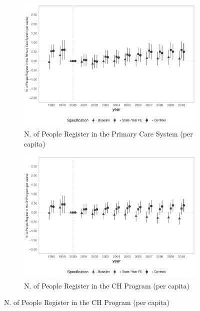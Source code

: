 \begin{figure}[h]
\begin{center}
\begin{subfigure}{0.32\textwidth}
    \end{subfigure}
    \begin{subfigure}{0.32\textwidth}
        \centering
        \caption{\scriptsize N. of People Register in the Primary Care System (per capita)}\label{fig:access1_c}
        \includegraphics[width=\textwidth]{plots/access/siab_regist_pers_pcapita_dist_ec29_baseline_dist_ec29_baseline_full.pdf}
    \end{subfigure}
    \begin{subfigure}{0.32\textwidth}
        \centering
        \caption{\scriptsize N. of People Register in the CH Program (per capita)}\label{fig:access1_d}
        \includegraphics[width=\textwidth]{plots/access/siab_regist_pers_pacs_pcapita_dist_ec29_baseline_dist_ec29_baseline_full.pdf}
    \end{subfigure}

\end{center}
\end{figure}
